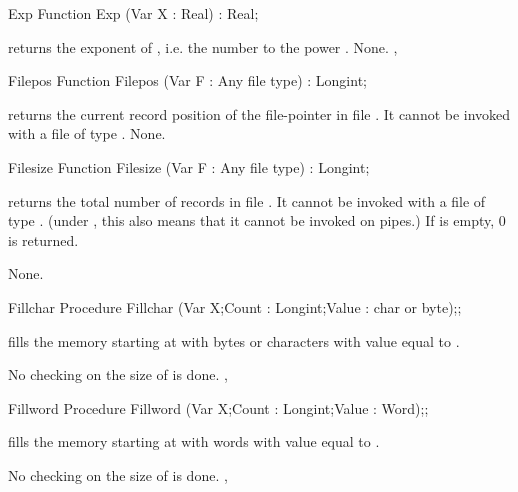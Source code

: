 \documentclass{report}
\begin{document}
\html{}
\begin{function}{Exp}
\Declaration
Function Exp (Var X : Real) : Real;

\Description
{} returns the exponent of , i.e. the number  to the
power .
\Errors
None.
\SeeAlso
{}, 
\end{function}
\html{}
\begin{function}{Filepos}
\Declaration
Function Filepos (Var F : Any file type) : Longint;

\Description
{} returns the current record position of the file-pointer in file
. It cannot be invoked with a file of type .
\Errors
None.
\SeeAlso
{}
\end{function}
\html{}
\begin{function}{Filesize}
\Declaration
Function Filesize (Var F : Any file type) : Longint;

\Description
{} returns the total number of records in file . 
It cannot be invoked with a file of type . (under \linux, this
also means that it cannot be invoked on pipes.)
If  is empty, 0 is returned.

\Errors
None.
\SeeAlso
{}
\end{function}
\html{}
\begin{procedure}{Fillchar}
\Declaration
Procedure Fillchar (Var X;Count : Longint;Value : char or byte);;

\Description
{} fills the memory starting at  with  bytes
or characters with value equal to .

\Errors
No checking on the size of  is done.
\SeeAlso
{}, 
\end{procedure}
\html{}
\begin{procedure}{Fillword}
\Declaration
Procedure Fillword (Var X;Count : Longint;Value : Word);;

\Description
{} fills the memory starting at  with  words
with value equal to .

\Errors
No checking on the size of  is done.
\SeeAlso
{}, 
\end{procedure}
\end{document}
